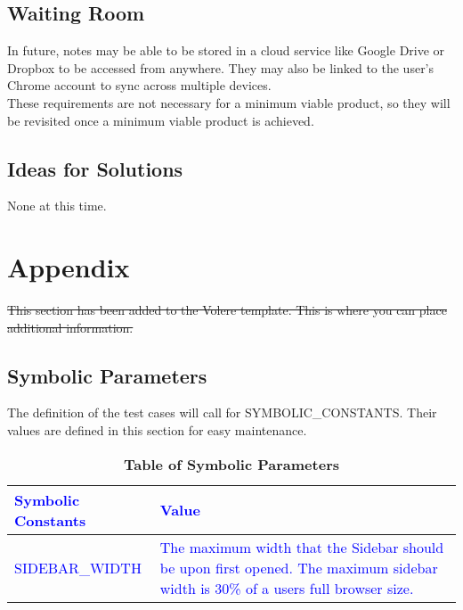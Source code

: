 \documentclass[12pt, titlepage]{article}
\begin{document}
\subsection{Waiting Room}
	In future, notes may be able to be stored in a cloud service like Google Drive or Dropbox to be accessed from anywhere. They may also be linked to the user's Chrome account to sync across multiple devices.\\
	These requirements are not necessary for a minimum viable product, so they will be revisited once a minimum viable product is achieved.
\subsection{Ideas for Solutions}
	None at this time.


%

\newpage

\section{Appendix}

\sout{This section has been added to the Volere template.  This is where you 
can place additional information.}

\subsection{Symbolic Parameters}

The definition of the test cases will call for SYMBOLIC\_CONSTANTS.
Their values are defined in this section for easy maintenance.

\begin{table}[!htbp]
	\caption{\textbf{Table of Symbolic Parameters}} \label{Table}
	
	\begin{tabularx}{\textwidth}{p{5cm}X}
		\toprule
		\textcolor{blue}{\textbf{Symbolic Constants}} & 
		\textcolor{blue}{\textbf{Value}}\\
		\midrule
		\textcolor{blue}{SIDEBAR\_WIDTH }& \textcolor{blue}{The maximum width 
		that the Sidebar 
		should be upon first opened. The maximum sidebar width is 30\% of a 
		users full browser size.}\\
		\bottomrule
	\end{tabularx}
	
\end{table}	
\end{document}
